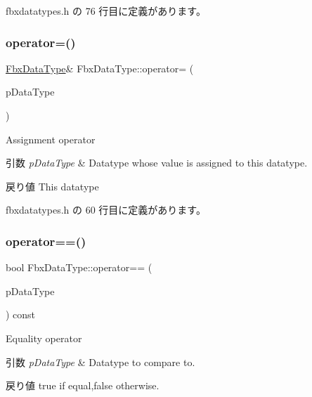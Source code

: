  fbxdatatypes.\+h の 76 行目に定義があります。

\mbox{\label{class_fbx_data_type_adb38a598b2865f0dc137a2ad298987d9}} 
\subsubsection{\texorpdfstring{operator=()}{operator=()}}
{\footnotesize\ttfamily \hyperlink{class_fbx_data_type}{Fbx\+Data\+Type}\& Fbx\+Data\+Type\+::operator= (\begin{DoxyParamCaption}\item[{const \hyperlink{class_fbx_data_type}{Fbx\+Data\+Type} \&}]{p\+Data\+Type }\end{DoxyParamCaption})\hspace{0.3cm}{\ttfamily [inline]}}

Assignment operator 
\begin{DoxyParams}{引数}
{\em p\+Data\+Type} & Datatype whose value is assigned to this datatype. \\
\hline
\end{DoxyParams}
\begin{DoxyReturn}{戻り値}
This datatype 
\end{DoxyReturn}


 fbxdatatypes.\+h の 60 行目に定義があります。

\mbox{\label{class_fbx_data_type_adb742e131aeab52ff8ca3bc095026e3d}} 
\subsubsection{\texorpdfstring{operator==()}{operator==()}}
{\footnotesize\ttfamily bool Fbx\+Data\+Type\+::operator== (\begin{DoxyParamCaption}\item[{const \hyperlink{class_fbx_data_type}{Fbx\+Data\+Type} \&}]{p\+Data\+Type }\end{DoxyParamCaption}) const\hspace{0.3cm}{\ttfamily [inline]}}

Equality operator 
\begin{DoxyParams}{引数}
{\em p\+Data\+Type} & Datatype to compare to. \\
\hline
\end{DoxyParams}
\begin{DoxyReturn}{戻り値}
{\ttfamily true} if equal,{\ttfamily false} otherwise. 
\end{DoxyReturn}


